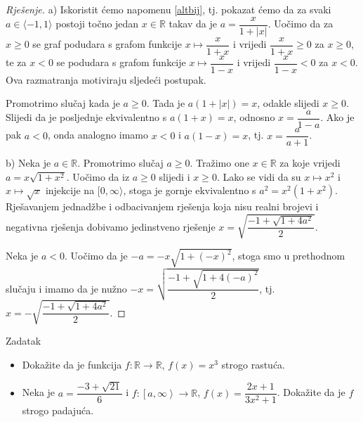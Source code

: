 \begin{proof}[Rješenje]
a) Iskoristit ćemo napomenu \ref{altbij}, tj. pokazat ćemo da za svaki $a\in \langle -1, 1\rangle$ postoji točno jedan $x\in \mathbb{R}$ takav da je $a=\dfrac{x}{1+|x|}$. Uočimo da za $x\geq 0$ se graf podudara s grafom funkcije $x\mapsto \dfrac{x}{1+x}$ i vrijedi $\dfrac{x}{1+x}\geq 0$ za $x\geq 0$, te za $x<0$ se podudara s grafom funkcije $x\mapsto \dfrac{x}{1-x}$ i vrijedi $\dfrac{x}{1-x}<0$ za $x<0$. Ova razmatranja motiviraju sljedeći postupak.

Promotrimo slučaj kada je $a\geq 0$. Tada je $a(1+|x|)=x$, odakle slijedi $x\geq 0$. Slijedi da je posljednje ekvivalentno s $a(1+x)=x$, odnosno $x=\dfrac{a}{1-a}$. Ako je pak $a<0$, onda analogno imamo $x<0$ i $a(1-x)=x$, tj. $x=\dfrac{a}{a+1}$.

b) Neka je $a\in \mathbb{R}$. Promotrimo slučaj $a\geq 0$. Tražimo one $x\in \mathbb{R}$ za koje vrijedi $a=x\sqrt{1+x^2}$. Uočimo da iz $a\geq 0$ slijedi i $x\geq 0$. Lako se vidi da su $x\mapsto x^2$ i $x\mapsto \sqrt{x}$ injekcije na $[0, \infty\rangle$, stoga je gornje ekvivalentno s $a^2=x^2(1+x^2)$. Rješavanjem jednadžbe i odbacivanjem rješenja koja nisu realni brojevi i negativna rješenja dobivamo jedinstveno rješenje $x=\sqrt{\dfrac{-1+\sqrt{1+4a^2}}{2}}$.

Neka je $a<0$. Uočimo da je $-a=-x\sqrt{1+(-x)^2}$, stoga smo u prethodnom slučaju i imamo da je nužno $-x=\sqrt{\dfrac{-1+\sqrt{1+4\left(-a\right)^2}}{2}}$, tj. $x=-\sqrt{\dfrac{-1+\sqrt{1+4a^2}}{2}}$.
\end{proof}
\begin{exercise}{Zadatak} \textbf{}
\begin{itemize}
\item[a)] Dokažite da je funkcija $f : \mathbb{R}\to \mathbb{R}$, $f(x)=x^3$ strogo rastuća.
\item[b)] Neka je $a=\dfrac{-3+\sqrt{21}}{6}$ i $f : \left[a, \infty\right\rangle\to \mathbb{R}$, $f(x)=\dfrac{2x+1}{3x^2+1}$. Dokažite da je $f$ strogo padajuća.
\end{itemize}
\end{exercise}
